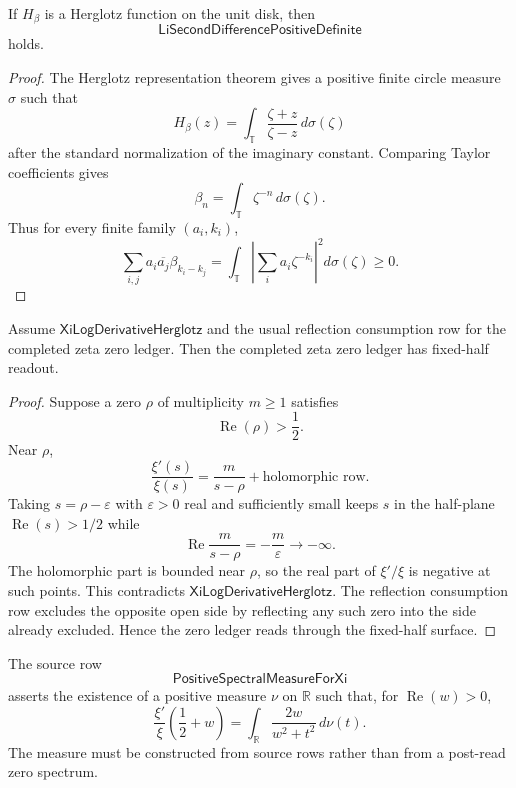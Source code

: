\begin{theorem}
\label{thm:rh-herglotz-row-gives-beta-positivity}
If $H_\beta$ is a Herglotz function on the unit disk, then
$$
\mathsf{LiSecondDifferencePositiveDefinite}
$$
holds.
\end{theorem}

\begin{proof}
The Herglotz representation theorem gives a positive finite circle
measure $\sigma$ such that
$$
H_\beta(z)
=
\int_{\mathbb T}\frac{\zeta+z}{\zeta-z}\,d\sigma(\zeta)
$$
after the standard normalization of the imaginary constant.  Comparing
Taylor coefficients gives
$$
\beta_n=\int_{\mathbb T}\zeta^{-n}\,d\sigma(\zeta).
$$
Thus for every finite family $(a_i,k_i)$,
$$
\sum_{i,j}a_i\overline{a_j}\beta_{k_i-k_j}
=
\int_{\mathbb T}
\left|
\sum_i a_i\zeta^{-k_i}
\right|^2
d\sigma(\zeta)
\ge0.
$$
\end{proof}

\begin{theorem}
\label{thm:rh-xi-herglotz-row-fixed-half-readout}
Assume $\mathsf{XiLogDerivativeHerglotz}$ and the usual reflection
consumption row for the completed zeta zero ledger.  Then the completed
zeta zero ledger has fixed-half readout.
\end{theorem}

\begin{proof}
Suppose a zero $\rho$ of multiplicity $m\ge1$ satisfies
$$
\operatorname{Re}(\rho)>\frac12.
$$
Near $\rho$,
$$
\frac{\xi'(s)}{\xi(s)}
=
\frac{m}{s-\rho}+\text{holomorphic row}.
$$
Taking $s=\rho-\varepsilon$ with $\varepsilon>0$ real and sufficiently
small keeps $s$ in the half-plane
$\operatorname{Re}(s)>1/2$ while
$$
\operatorname{Re}\frac{m}{s-\rho}
=
-\frac{m}{\varepsilon}
\to-\infty.
$$
The holomorphic part is bounded near $\rho$, so the real part of
$\xi'/\xi$ is negative at such points.  This contradicts
$\mathsf{XiLogDerivativeHerglotz}$.  The reflection consumption row
excludes the opposite open side by reflecting any such zero into the
side already excluded.  Hence the zero ledger reads through the
fixed-half surface.
\end{proof}

\begin{definition}
\label{def:rh-positive-spectral-measure-for-xi}
The source row
$$
\mathsf{PositiveSpectralMeasureForXi}
$$
asserts the existence of a positive measure $\nu$ on $\mathbb R$ such
that, for $\operatorname{Re}(w)>0$,
$$
\frac{\xi'}{\xi}\left(\frac12+w\right)
=
\int_{\mathbb R}
\frac{2w}{w^2+t^2}\,d\nu(t).
$$
The measure must be constructed from source rows rather than from a
post-read zero spectrum.
\end{definition}

